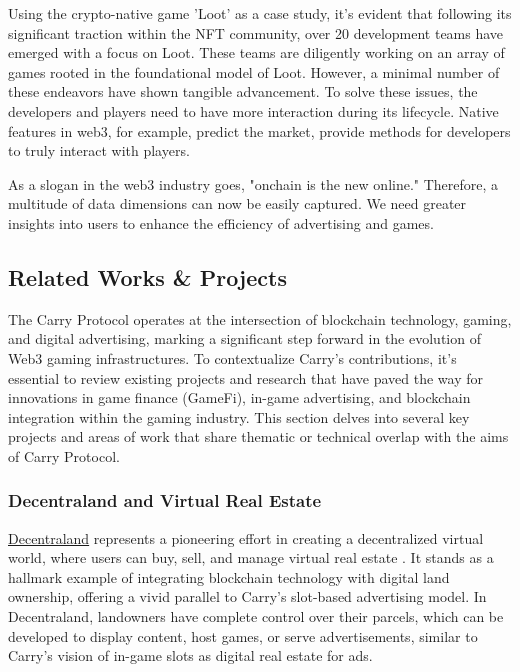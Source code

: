 \begin{itemize}[leftmargin=*]
    Using the crypto-native game ’Loot’ as a case study, it’s evident that following its significant traction within the NFT community, over 20 development teams have emerged with a focus on Loot. These teams are diligently working on an array of games rooted in the foundational model of Loot. However, a minimal number of these endeavors have shown tangible advancement. To solve these issues, the developers and players need to have more interaction during its lifecycle. Native features in web3, for example, predict the market, provide methods for developers to truly interact with players.
 
    As a slogan in the web3 industry goes, "onchain is the new online." Therefore, a multitude of data dimensions can now be easily captured. We need greater insights into users to enhance the efficiency of advertising and games.
\end{itemize}

\subsection{Related Works \& Projects}
The Carry Protocol operates at the intersection of blockchain technology, gaming, and digital advertising, marking a significant step forward in the evolution of Web3 gaming infrastructures. To contextualize Carry's contributions, it's essential to review existing projects and research that have paved the way for innovations in game finance (GameFi), in-game advertising, and blockchain integration within the gaming industry. This section delves into several key projects and areas of work that share thematic or technical overlap with the aims of Carry Protocol.

\subsubsection{Decentraland and Virtual Real Estate}


\href{https://decentraland.org/}{Decentraland} represents a pioneering effort in creating a decentralized virtual world, where users can buy, sell, and manage virtual real estate \cite{guidi2022social}. It stands as a hallmark example of integrating blockchain technology with digital land ownership, offering a vivid parallel to Carry's slot-based advertising model. In Decentraland, landowners have complete control over their parcels, which can be developed to display content, host games, or serve advertisements, similar to Carry's vision of in-game slots as digital real estate for ads.

